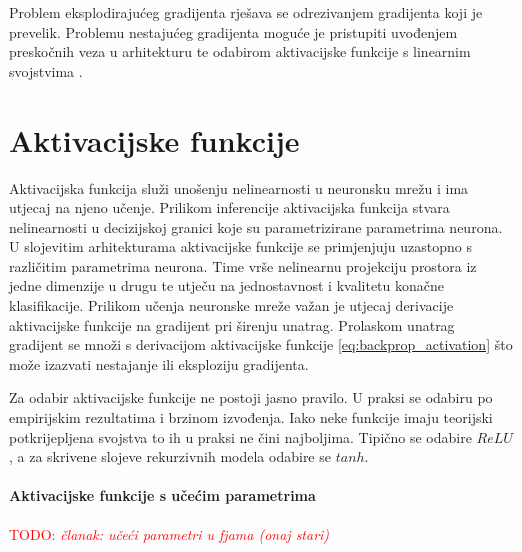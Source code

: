 \documentclass[times, utf8, numeric, diplomski]{fer}
\def\TODO#1{\noindent\textcolor{red}{TODO: \textit{#1}}\newline}
\def\todo#1{\TODO{#1}}
\begin{document}
Problem eksplodirajućeg gradijenta rješava se odrezivanjem gradijenta koji je prevelik. Problemu nestajućeg gradijenta moguće je pristupiti uvođenjem preskočnih veza u arhitekturu \citep{highwaynet,resnet,densenet} te odabirom aktivacijske funkcije s linearnim svojstvima \citep{elish}.

%

\chapter{Aktivacijske funkcije}
\label{sec:aktivacijske_fje}
Aktivacijska funkcija služi unošenju nelinearnosti u neuronsku mrežu i ima utjecaj na njeno učenje. Prilikom inferencije aktivacijska funkcija stvara nelinearnosti u decizijskoj granici koje su parametrizirane parametrima neurona. U slojevitim arhitekturama aktivacijske funkcije se primjenjuju uzastopno s različitim parametrima neurona. Time vrše nelinearnu projekciju prostora iz jedne dimenzije u drugu te utječu na jednostavnost i kvalitetu konačne klasifikacije. Prilikom učenja neuronske mreže važan je utjecaj derivacije aktivacijske funkcije na gradijent pri širenju unatrag. Prolaskom unatrag gradijent se množi s derivacijom aktivacijske funkcije \eqref{eq:backprop_activation} što može izazvati nestajanje ili eksploziju gradijenta.

Za odabir aktivacijske funkcije ne postoji jasno pravilo. U praksi se odabiru po empirijskim rezultatima i brzinom izvođenja. Iako neke funkcije imaju teorijski potkrijepljena svojstva to ih u praksi ne čini najboljima. Tipično se odabire $ReLU$, a za skrivene slojeve rekurzivnih modela odabire se $tanh$.


\iffalse %
\subsubsection{Aktivacijske funkcije s učećim parametrima}
\todo{članak: učeći parametri u fjama (onaj stari)}
\end{document}
